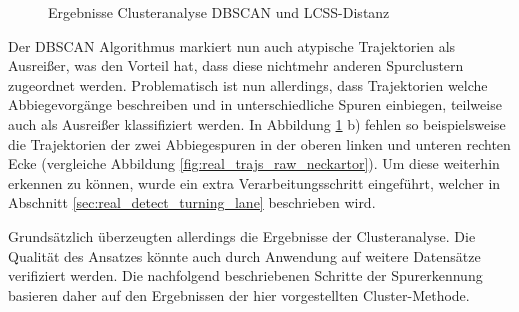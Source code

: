 \begin{figure}[H]
    \centering
    \qquad \qquad
    \caption{Ergebnisse Clusteranalyse DBSCAN und LCSS-Distanz}
    \label{fig:real_results_dbscan_lcss}
\end{figure}

Der DBSCAN Algorithmus markiert nun auch atypische Trajektorien als Ausreißer, was den Vorteil hat, dass
diese nichtmehr anderen Spurclustern zugeordnet werden. Problematisch ist nun allerdings, dass Trajektorien
welche Abbiegevorgänge beschreiben und in unterschiedliche Spuren einbiegen, teilweise auch als Ausreißer
klassifiziert werden. In Abbildung \ref{fig:real_results_dbscan_lcss} b) fehlen so beispielsweise die Trajektorien
der zwei Abbiegespuren in der oberen linken und unteren rechten Ecke (vergleiche Abbildung \ref{fig:real_trajs_raw_neckartor}).
Um diese weiterhin erkennen zu können, wurde ein extra Verarbeitungsschritt eingeführt, welcher in Abschnitt
\ref{sec:real_detect_turning_lane} beschrieben wird.

Grundsätzlich überzeugten allerdings die Ergebnisse der Clusteranalyse. Die Qualität des Ansatzes könnte auch
durch Anwendung auf weitere Datensätze verifiziert werden. Die nachfolgend beschriebenen Schritte der Spurerkennung
basieren daher auf den Ergebnissen der hier vorgestellten Cluster-Methode.

